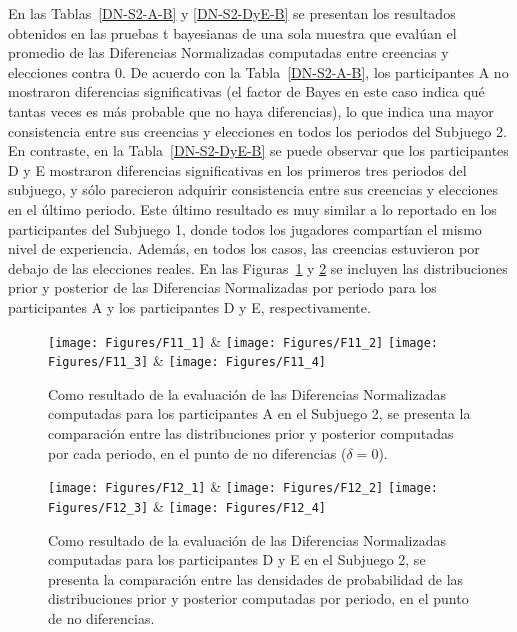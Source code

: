 En las Tablas~\ref{DN-S2-A-B} y \ref{DN-S2-DyE-B} se presentan los resultados obtenidos en las pruebas t bayesianas de una sola muestra que evalúan el promedio de las Diferencias Normalizadas computadas entre creencias y elecciones contra 0. De acuerdo con la Tabla~\ref{DN-S2-A-B}, los participantes A no mostraron diferencias significativas (el factor de Bayes en este caso indica qué tantas veces es más probable que no haya diferencias), lo que indica una mayor consistencia entre sus creencias y elecciones en todos los periodos del Subjuego 2. En contraste, en la Tabla~\ref{DN-S2-DyE-B} se puede observar que los participantes D y E mostraron diferencias significativas en los primeros tres periodos del subjuego, y sólo parecieron  adquirir consistencia entre sus creencias y elecciones en el último periodo. Este último resultado es muy similar a lo reportado en los participantes del Subjuego 1, donde todos los jugadores compartían el mismo nivel de experiencia. Además, en todos los casos, las creencias estuvieron por debajo de las elecciones reales. En las Figuras~\ref{fig:DN_S2_A} y \ref{fig:DN_S2_DyE} se incluyen las distribuciones prior y posterior de las Diferencias Normalizadas por periodo para los participantes A y los participantes D y E, respectivamente.\\ 

\begin{figure}[h]
\centering
\texttt{[image: Figures/F11\_1]} & \texttt{[image: Figures/F11\_2]} 
\texttt{[image: Figures/F11\_3]} & \texttt{[image: Figures/F11\_4]} 
\decoRule
\caption[Evaluación de las Diferencias Normalizadas entre creencias y elecciones en los participantes A en el Subjuego 2 (Factor de Bayes)]{Como resultado de la evaluación de las Diferencias Normalizadas computadas para los participantes A en el Subjuego 2, se presenta la comparación entre las distribuciones prior y posterior computadas por cada periodo, en el punto de no diferencias ($\delta = 0$).}
\label{fig:DN_S2_A}
\end{figure}  


\begin{figure}[h]
\centering
\texttt{[image: Figures/F12\_1]} & \texttt{[image: Figures/F12\_2]} 
\texttt{[image: Figures/F12\_3]} & \texttt{[image: Figures/F12\_4]} 
\decoRule
\caption[Evaluación de las Diferencias Normalizadas entre creencias y elecciones en los participantes D y E en el Subjuego 2 (Factor de Bayes)]{Como resultado de la evaluación de las Diferencias Normalizadas computadas para los participantes D y E en el Subjuego 2, se presenta la comparación entre las densidades de probabilidad de las distribuciones prior y posterior computadas por periodo, en el punto de no diferencias.}
\label{fig:DN_S2_DyE}
\end{figure}  


